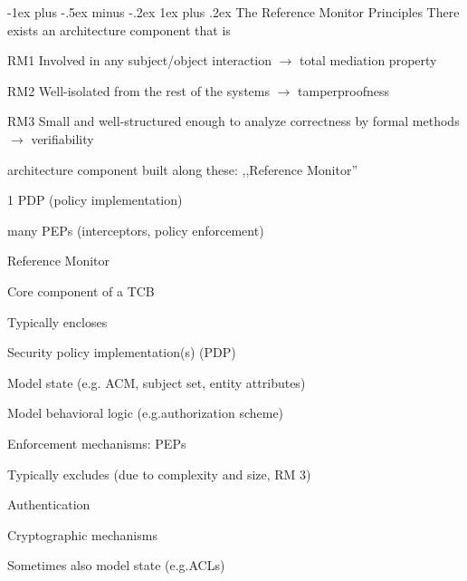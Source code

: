 \documentclass[a4paper]{article}
\makeatletter
\renewcommand{\subsubsection}{\@startsection{subsubsection}{3}{0mm}%
                {-1ex plus -.5ex minus -.2ex}%
                {1ex plus .2ex}%
                {\normalfont\small\bfseries}}
\makeatother
\begin{document}
\begin{multicols}{3}
    \subsubsection{The Reference Monitor Principles}
    There exists an architecture component that is
    \begin{itemize*}
        \item[RM1] Involved in any subject/object interaction $\rightarrow$ total mediation property
        \item[RM2] Well-isolated from the rest of the systems $\rightarrow$ tamperproofness
        \item[RM3] Small and well-structured enough to analyze correctness by formal methods $\rightarrow$ verifiability
    \end{itemize*}

    architecture component built along these: ,,Reference Monitor''
    \begin{itemize*}
        \item 1 PDP (policy implementation)
        \item many PEPs (interceptors, policy enforcement)
    \end{itemize*}

    Reference Monitor
    \begin{itemize*}
        \item Core component of a TCB
        \item Typically encloses
        \begin{itemize*}
            \item Security policy implementation(s) (PDP)
            \begin{itemize*}
                \item Model state (e.g. ACM, subject set, entity attributes)
                \item Model behavioral logic (e.g.authorization scheme)
            \end{itemize*}
            \item Enforcement mechanisms: PEPs
        \end{itemize*}
        \item Typically excludes (due to complexity and size, RM 3)
        \begin{itemize*}
            \item Authentication
            \item Cryptographic mechanisms
            \item Sometimes also model state (e.g.ACLs)
        \end{itemize*}
    \end{itemize*}


\end{multicols}
\end{document}

